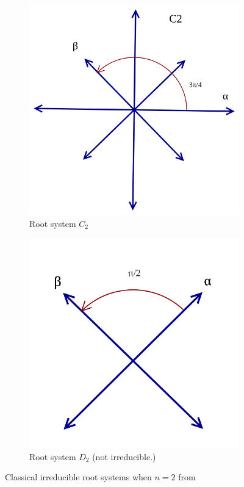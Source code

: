 \documentclass[11pt,leqno,oneside]{amsart}
\numberwithin{thm}{section}
\begin{document}
\begin{figure}
\begin{subfigure}{.3\textwidth}
    \includegraphics[width=\textwidth]{images/Root_system_C2_with_labels.png}
    \caption{Root system $C_2$}
  \end{subfigure}
  \begin{subfigure}{.3\textwidth}
    \centering
    \includegraphics[width=\textwidth]{images/Root_system_D2_with_labels.png}
    \caption{Root system $D_2$ (not irreducible.)}
  \end{subfigure}
  \caption{Classical irreducible root systems when \(n=2\) from \cite{wiki}}
\end{figure}
\end{document}
